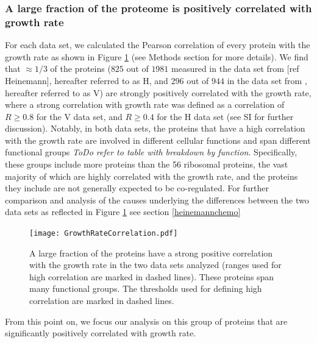 \documentclass[notitlepage]{article}
\begin{document}
\subsubsection{A large fraction of the proteome is positively correlated with growth rate}
For each data set, we calculated the Pearson correlation of every protein with the growth rate as shown in Figure \ref{fig:growthcorr} (see Methods section for more details).
We find that $\approx 1/3$ of the proteins ($825$ out of $1981$ measured in the data set from [ref Heinemann], hereafter referred to as H, and $296$ out of $944$ in the data set from \parencite{Valgepea2013}, hereafter referred to as V) are strongly positively correlated with the growth rate, where a strong correlation with growth rate was defined as a correlation of $R\geq 0.8$ for the V data set, and $R\geq 0.4$ for the H data set (see SI for further discussion).
Notably, in both data sets, the proteins that have a high correlation with the growth rate are involved in different cellular functions and span different functional groups \emph{ToDo refer to table with breakdown by function}.
Specifically, these groups include more proteins than the 56 ribosomal proteins, the vast majority of which are highly correlated with the growth rate, and the proteins they include are not generally expected to be co-regulated.
For further comparison and analysis of the causes underlying the differences between the two data sets as reflected in Figure \ref{fig:growthcorr} see section \ref{heinemannchemo}

\begin{figure}[h]
\centering
\texttt{[image: GrowthRateCorrelation.pdf]}
\caption{
A large fraction of the proteins have a strong positive correlation with the growth rate in the two data sets analyzed (ranges used for high correlation are marked in dashed lines).
These proteins span many functional groups.
The thresholds used for defining high correlation are marked in dashed lines.
}
\label{fig:growthcorr}
\end{figure}
From this point on, we focus our analysis on this group of proteins that are significantly positively correlated with growth rate.
\end{document}
